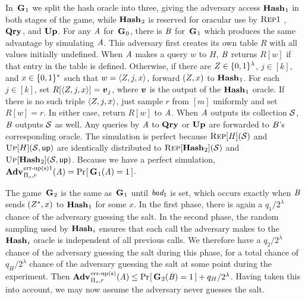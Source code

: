 In~$\textup{\textbf{G}}\hspace{0.5pt}_1$ we split the hash oracle into three, giving the adversary access
$\textup{\textbf{Hash}}\hspace{0.5pt}_1$ in both stages of the game, while $\textup{\textbf{Hash}}\hspace{0.5pt}_2$ is reserved for oracular
use by $\textnormal{\textsc{Rep}}1$ , $\textup{\textbf{Qry}}\hspace{0.5pt}$, and $\textup{\textbf{Up}}\hspace{0.5pt}$. For any $\mathit{A}$ for~$\textup{\textbf{G}}\hspace{0.5pt}_0$, there is
$\mathit{B}$ for~$\textup{\textbf{G}}\hspace{0.5pt}_1$ which produces the same advantage by simulating $\mathit{A}$.
This adversary first creates its own table $R$ with all values initially
undefined.  When $\mathit{A}$ makes a query $w$ to $H$, $\mathit{B}$ returns $R[w]$ if
that entry in the table is defined. Otherwise, if there are $Z \in
\{0,1\}^\lambda$, $j \in [k]$, and $x \in \{0,1\}^*$ such that $w = \langle Z, j,
x\rangle$, forward $(Z,x)$ to $\textup{\textbf{Hash}}\hspace{0.5pt}_1$. For each $j \in [k]$, set
$R[\langle Z, j, x\rangle] = \boldsymbol{v}_j$, where $\boldsymbol{v}$ is the output of the
$\textup{\textbf{Hash}}\hspace{0.5pt}_1$ oracle. If there is no such triple $\langle Z, j, x\rangle$, just
sample $r$ from $[m]$ uniformly and set $R[w] = r$.
%
%
In either case, return
$R[w]$ to $\mathit{A}$. When $\mathit{A}$ outputs its collection $\mathcal{S}$, $\mathit{B}$ outputs
$\mathcal{S}$ as well. Any queries by $\mathit{A}$ to $\textup{\textbf{Qry}}\hspace{0.5pt}$ or $\textup{\textbf{Up}}\hspace{0.5pt}$ are forwarded to
$\mathit{B}$'s corresponding oracle. The simulation is perfect because
$\textnormal{\textsc{Rep}}[H](\mathcal{S})$ and $\textnormal{\textsc{Up}}[H](\mathcal{S},\mathsf{up})$ are identically distributed to
$\textnormal{\textsc{Rep}}[\textup{\textbf{Hash}}\hspace{0.5pt}_2](\mathcal{S})$ and
$\textnormal{\textsc{Up}}[\textup{\textbf{Hash}}\hspace{0.5pt}_2](\mathcal{S},\mathsf{up})$. Because we have a perfect simulation,
$\Adv{\erreps1}_{\struct_s,r}(\advA) = \Prob{\game_1(\advA) = 1}$.

The game~$\textup{\textbf{G}}\hspace{0.5pt}_2$ is the same as~$\textup{\textbf{G}}\hspace{0.5pt}_1$ until $\textit{bad}_1$ is set, which occurs
exactly when $\mathit{B}$ sends $(Z^*,x)$ to $\textup{\textbf{Hash}}\hspace{0.5pt}_1$ for some $x$. In the
first phase, there is again a $q_1/2^\lambda$ chance of the adversary guessing
the salt. In the second phase, the random sampling used by $\textup{\textbf{Hash}}\hspace{0.5pt}_i$ ensures
that each call the adversary makes to the $\textup{\textbf{Hash}}\hspace{0.5pt}_i$ oracle is independent of
all previous calls. We therefore have a $q_2/2^\lambda$ chance of the adversary
guessing the salt during this phase, for a total chance of $q_H/2^\lambda$
chance of the adversary guessing the salt at some point during the experiment.
Then $\Adv{\erreps}_{\struct_s,r}(\advA) \le \Prob{\game_2(\advB) = 1} +
q_H/2^\lambda$. Having taken this into account, we may now assume the adversary
never guesses the salt.
%



